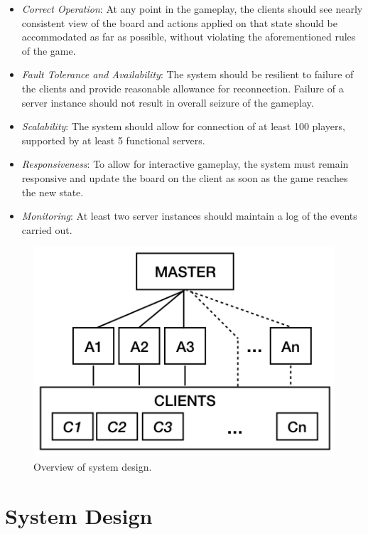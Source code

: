 \documentclass[a4paper]{IEEEtran}
\begin{document}
  \begin{itemize}
    \item \emph{Correct Operation}: At any point in the gameplay, the clients should see nearly consistent view of the board and actions applied on that state should be accommodated as far as possible, without violating the aforementioned rules of the game.
    \item \emph{Fault Tolerance and Availability}: The system should be resilient to failure of the clients and provide reasonable allowance for reconnection. Failure of a server instance should not result in overall seizure of the gameplay.
    \item \emph{Scalability}: The system should allow for connection of at least 100 players, supported by at least 5 functional servers.
    \item \emph{Responsiveness}: To allow for interactive gameplay, the system must remain responsive and update the board on the client as soon as the game reaches the new state.
    \item \emph{Monitoring}: At least two server instances should maintain a log of the events carried out. 
  \end{itemize}
  
  \begin{figure}[tbp]
    \centering
      \includegraphics[width=\columnwidth]{system_design.png}
    \caption{Overview of system design.}
    \label{fig:overview_system_design}
  \end{figure}
  
  \section{System Design} \label{system_design}
  
\end{document}
